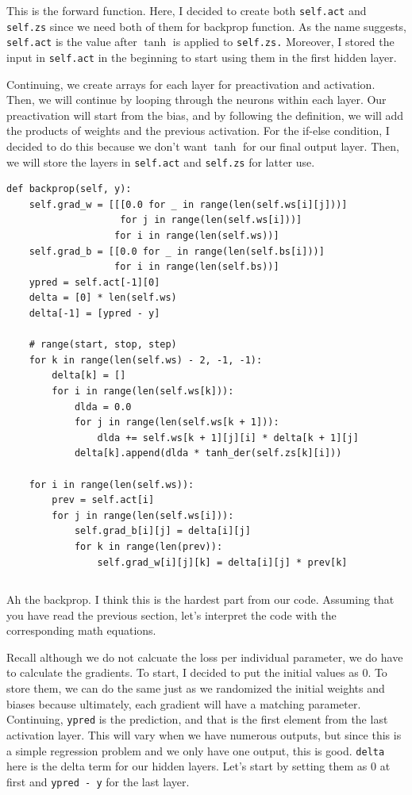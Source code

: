 \documentclass[../../../main.tex]{subfiles}
\begin{document}
This is the forward function. Here, I decided to create both
\verb|self.act| and \verb|self.zs| since we need both of them
for backprop function. As the name suggests, \verb|self.act| is the
value after $\tanh$ is applied to \verb|self.zs.| Moreover, I stored
the input in \verb|self.act| in the beginning to start using them in
the first hidden layer.

Continuing, we create arrays for each layer for preactivation
and activation. Then, we will continue by looping through the
neurons within each layer. Our preactivation will start from
the bias, and by following the definition, we will add the products
of weights and the previous activation. For the if-else condition,
I decided to do this because we don't want $\tanh$ for our final
output layer. Then, we will store the layers in \verb|self.act| and
\verb|self.zs| for latter use.

\begin{jupyter}
\begin{lstlisting}[style=jin]
def backprop(self, y):
    self.grad_w = [[[0.0 for _ in range(len(self.ws[i][j]))]
                    for j in range(len(self.ws[i]))]
                   for i in range(len(self.ws))]
    self.grad_b = [[0.0 for _ in range(len(self.bs[i]))]
                   for i in range(len(self.bs))]
    ypred = self.act[-1][0]
    delta = [0] * len(self.ws)
    delta[-1] = [ypred - y]

    # range(start, stop, step)
    for k in range(len(self.ws) - 2, -1, -1):
        delta[k] = []
        for i in range(len(self.ws[k])):
            dlda = 0.0
            for j in range(len(self.ws[k + 1])):
                dlda += self.ws[k + 1][j][i] * delta[k + 1][j]
            delta[k].append(dlda * tanh_der(self.zs[k][i]))

    for i in range(len(self.ws)):
        prev = self.act[i]
        for j in range(len(self.ws[i])):
            self.grad_b[i][j] = delta[i][j]
            for k in range(len(prev)):
                self.grad_w[i][j][k] = delta[i][j] * prev[k]
\end{lstlisting}
\begin{lstlisting}[style=jout]
\end{lstlisting}
\end{jupyter}

Ah the backprop. I think this is the hardest part from our code.
Assuming that you have read the previous section, let's interpret
the code with the corresponding math equations.

Recall although we do not calcuate the loss per individual parameter,
we do have to calculate the gradients. To start, I decided to put
the initial values as $0$. To store them, we can do the same just
as we randomized the initial weights and biases because ultimately,
each gradient will have a matching parameter. Continuing, \verb|ypred|
is the prediction, and that is the first element from the last
activation layer. This will vary when we have numerous outputs,
but since this is a simple regression problem and we only have one
output, this is good. \verb|delta| here is the delta term for our
hidden layers. Let's start by setting them as $0$ at first and
\verb|ypred - y| for the last layer.
\end{document}
